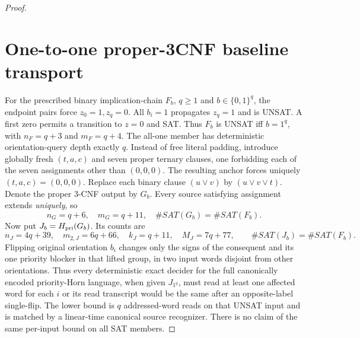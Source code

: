 \documentclass[11pt]{article}
\begin{document}
\begin{proof}
\section{One-to-one proper-3CNF baseline transport}
For the prescribed binary implication-chain $F_b$, $q\ge1$ and $b\in\{0,1\}^q$, the endpoint pairs force $z_0=1,z_q=0$. All $b_i=1$ propagates $z_q=1$ and is UNSAT. A first zero permits a transition to $z=0$ and SAT. Thus $F_b$ is UNSAT iff $b=1^q$, with $n_F=q+3$ and $m_F=q+4$. The all-one member has deterministic orientation-query depth exactly $q$.
Instead of free literal padding, introduce globally fresh $(t,a,c)$ and seven proper ternary clauses, one forbidding each of the seven assignments other than $(0,0,0)$. The resulting anchor forces uniquely $(t,a,c)=(0,0,0)$. Replace each binary clause $(u\vee v)$ by $(u\vee v\vee t)$. Denote the proper 3-CNF output by $G_b$. Every source satisfying assignment extends \emph{uniquely}, so
\[
n_G=q+6,\quad m_G=q+11,\quad \#SAT(G_b)=\#SAT(F_b).
\]
Now put $J_b=H_{\rm pri}(G_b)$. Its counts are
\[
n_J=4q+39,\quad m_{2,J}=6q+66,\quad k_J=q+11,\quad
M_J=7q+77,
\qquad \#SAT(J_b)=\#SAT(F_b).
\]
Flipping original orientation $b_i$ changes only the signs of the consequent and its one priority blocker in that lifted group, in two input words disjoint from other orientations. Thus every deterministic exact decider for the full canonically encoded priority-Horn language, when given $J_{1^q}$, must read at least one affected word for each $i$ or its read transcript would be the same after an opposite-label single-flip. The lower bound is $q$ addressed-word reads on that UNSAT input and is matched by a linear-time canonical source recognizer. There is no claim of the same per-input bound on all SAT members.

\end{proof}
\end{document}

